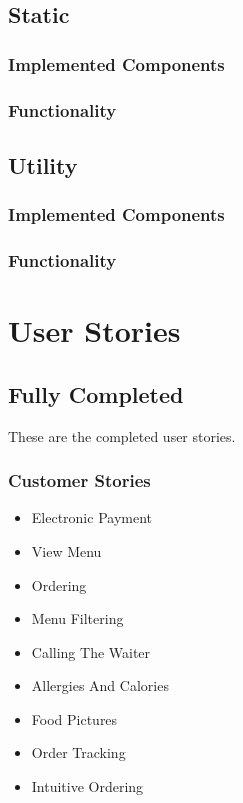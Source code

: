 \documentclass[12pt, twoside, a4paper]{report}
\begin{document}
\section*{Static}\label{sec:static}
\subsection*{Implemented Components}
\subsection*{Functionality}

\section*{Utility}\label{sec:util}
\subsection*{Implemented Components}
\subsection*{Functionality}

\chapter*{User Stories}
\section*{Fully Completed}
These are the completed user stories.
\subsection*{Customer Stories}
\begin{itemize}
  \item Electronic Payment
  \item View Menu
  \item Ordering
  \item Menu Filtering
  \item Calling The Waiter
  \item Allergies And Calories
  \item Food Pictures
  \item Order Tracking
  \item Intuitive Ordering
\end{itemize}
\end{document}
